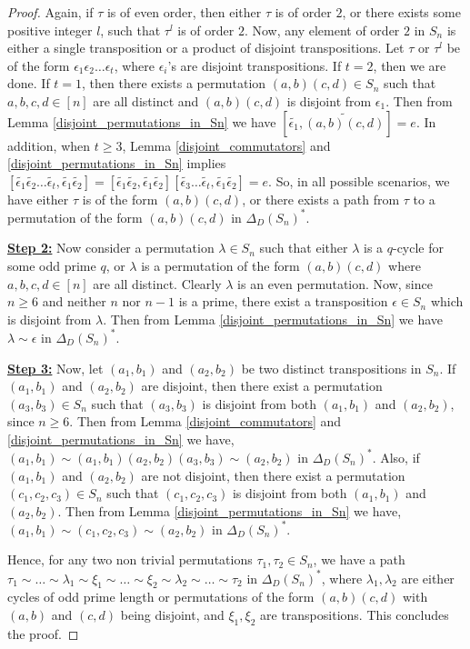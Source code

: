 \documentclass[12pt,a4paper]{article}
\begin{document}
\begin{proof}
Again, if $\tau$ is of even order, then either $\tau$ is of order $2$, or there exists some positive integer $l$, such that $\tau^l$ is of order $2$. Now, any element of order $2$ in $S_n$ is either a single transposition or a product of disjoint transpositions. Let $\tau$ or $\tau^l$ be of the form $\epsilon_1\epsilon_2\dots\epsilon_t$, where $\epsilon_i$'s are disjoint transpositions. If $t=2$, then we are done. If $t=1$, then there exists a permutation $(a,b)(c,d)\in S_n$ such that $a,b,c,d\in[n]$ are all distinct and $(a,b)(c,d)$ is disjoint from $\epsilon_1$. Then from Lemma \ref{disjoint_permutations_in_Sn} we have $[\tilde{\epsilon_1},\tilde{(a,b)(c,d)}]=e$. In addition, when $t\geq 3$, Lemma \ref{disjoint_commutators} and \ref{disjoint_permutations_in_Sn} implies $[\tilde{\epsilon_1}\tilde{\epsilon_2}\dots\tilde{\epsilon_t},\tilde{\epsilon_1}\tilde{\epsilon_2}]=[\tilde{\epsilon_1}\tilde{\epsilon_2},\tilde{\epsilon_1}\tilde{\epsilon_2}][\tilde{\epsilon_3}\dots\tilde{\epsilon_t},\tilde{\epsilon_1}\tilde{\epsilon_2}]=e$. So, in all possible scenarios, we have either $\tau$ is of the form $(a,b)(c,d)$, or there exists a path from $\tau$ to a permutation of the form $(a,b)(c,d)$ in $\Delta_D(S_n)^*$. 

\noindent\underline{\bf{Step 2:}} Now consider a permutation $\lambda\in S_n$ such that either $\lambda$ is a $q$-cycle for some odd prime $q$, or $\lambda$ is a permutation of the form $(a,b)(c,d)$ where $a,b,c,d\in[n]$ are all distinct. Clearly $\lambda$ is an even permutation. Now, since $n\geq 6$ and neither $n$ nor $n-1$ is a prime, there exist a transposition $\epsilon\in S_n$ which is disjoint from $\lambda$. Then from Lemma \ref{disjoint_permutations_in_Sn} we have $\lambda\sim\epsilon$ in $\Delta_D(S_n)^*$. 

\noindent\underline{\bf{Step 3:}} Now, let $(a_1,b_1)$ and $(a_2,b_2)$ be two distinct transpositions in $S_n$. If $(a_1,b_1)$ and $(a_2,b_2)$ are disjoint, then there exist a permutation $(a_3,b_3)\in S_n$ such that $(a_3,b_3)$ is disjoint from both $(a_1,b_1)$ and $(a_2,b_2)$, since $n\geq 6$. Then from Lemma \ref{disjoint_commutators} and \ref{disjoint_permutations_in_Sn} we have, $(a_1,b_1)\sim (a_1,b_1)(a_2,b_2)(a_3,b_3)\sim(a_2,b_2)$ in $\Delta_D(S_n)^*$. Also, if $(a_1,b_1)$ and $(a_2,b_2)$ are not disjoint, then there exist a permutation $(c_1,c_2,c_3)\in S_n$ such that $(c_1,c_2,c_3)$ is disjoint from both $(a_1,b_1)$ and $(a_2,b_2)$. Then from Lemma \ref{disjoint_permutations_in_Sn} we have, $(a_1,b_1)\sim (c_1,c_2,c_3)\sim(a_2,b_2)$ in $\Delta_D(S_n)^*$.

Hence, for any two non trivial permutations $\tau_1, \tau_2\in S_n$, we have a path $\tau_1\sim\dots\sim\lambda_1\sim\xi_1\sim\dots\sim\xi_2\sim\lambda_2\sim\dots\sim\tau_2$ in $\Delta_D(S_n)^*$, where $\lambda_1,\lambda_2$ are either cycles of odd prime length or permutations of the form $(a,b)(c,d)$ with $(a,b)$ and $(c,d)$ being disjoint, and $\xi_1,\xi_2$ are transpositions. This concludes the proof.
\end{proof}
\end{document}
